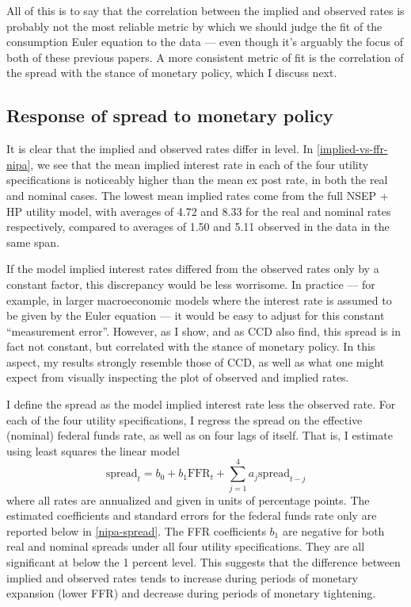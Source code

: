 All of this is to say that the correlation between the implied and observed rates is probably not the most reliable metric by which we should judge the fit of the consumption Euler equation to the data --- even though it's arguably the focus of both of these previous papers. A more consistent metric of fit is the correlation of the spread with the stance of monetary policy, which I discuss next.



\subsection{Response of spread to monetary policy}
It is clear that the implied and observed rates differ in level. In \autoref{implied-vs-ffr-nipa}, we see that the mean implied interest rate in each of the four utility specifications is noticeably higher than the mean ex post rate, in both the real and nominal cases. The lowest mean implied rates come from the full NSEP + HP utility model, with averages of 4.72 and 8.33 for the real and nominal rates respectively, compared to averages of 1.50 and 5.11 observed in the data in the same span.

If the model implied interest rates differed from the observed rates only by a constant factor, this discrepancy would be less worrisome. In practice --- for example, in larger macroeconomic models where the interest rate is assumed to be given by the Euler equation --- it would be easy to adjust for this constant ``measurement error''. However, as I show, and as CCD also find, this spread is in fact not constant, but correlated with the stance of monetary policy. In this aspect, my results strongly resemble those of CCD, as well as what one might expect from visually inspecting the plot of observed and implied rates.

I define the spread as the model implied interest rate less the observed rate. For each of the four utility specifications, I regress the spread on the effective (nominal) federal funds rate, as well as on four lags of itself. That is, I estimate using least squares the linear model
\begin{equation}
\label{spread-ffr-regression}
\mathrm{spread}_t = b_0 + b_1 \mathrm{FFR}_t + \sum_{j=1}^4 a_j \mathrm{spread}_{t-j}
\end{equation}
where all rates are annualized and given in units of percentage points. The estimated coefficients and standard errors for the federal funds rate only are reported below in \autoref{nipa-spread}. The FFR coefficients $b_1$ are negative for both real and nominal spreads under all four utility specifications. They are all significant at below the 1 percent level. This suggests that the difference between implied and observed rates tends to increase during periods of monetary expansion (lower FFR) and decrease during periods of monetary tightening.

